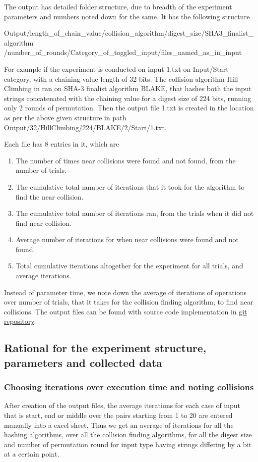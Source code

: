 The output has detailed folder structure, due to breadth of the experiment parameters and numbers noted down for
the same. It has the following structure
\begin{center}Output/length\_of\_chain\_value/collision\_algorithm/digest\_size/SHA3\_finalist\_algorithm
/number\_of\_rounds/Category\_of\_toggled\_input/files\_named\_as\_in\_input\end{center}

For example if the experiment is conducted on input 1.txt on Input/Start category, with a chaining value length of 
32 bits. The collision algorithm Hill Climbing in ran on SHA-3 finalist algorithm BLAKE, that hashes both the input 
strings concatenated with the chaining value for a digest size of 224 bits, running only 2 rounds of permutation.
Then the output file 1.txt is created in the location as per the above given structure in path 
Output/32/HillClimbing/224/BLAKE/2/Start/1.txt.

Each file has 8 entries in it, which are 
\begin{enumerate}
\item The number of times near collisions were found and not found, from the number of trials.
\item The cumulative total number of iterations that it took for the algorithm to find the near collision.
\item The cumulative total number of iterations ran, from the trials when it did not find near collision.
\item Average number of iterations for when near collisions were found and not found.
\item Total cumulative iterations altogether for the experiment for all trials, and average iterations.
\end{enumerate}

Instead of parameter time, we note down the average of iterations of operations over number of trials, that it
takes for the collision finding algorithm, to find near collisions. The output files can be found with source code
implementation in \href{"https://github.com/sxs9174/MSProjectCode/tree/master/MSProjectCode/Output"}
{git repository}.

\subsection{Rational for the experiment structure, parameters and collected data}

\subsubsection{Choosing iterations over execution time and noting collisions}
After creation of the output files, the average iterations for each case of input that is start, end or middle
over the pairs starting from 1 to 20 are entered manually into a excel sheet. Thus we get an average of iterations
for all the hashing algorithms, over all the collision finding algorithms, for all the digest size and number of
permutation round for input type having strings differing by a bit at a certain point.

